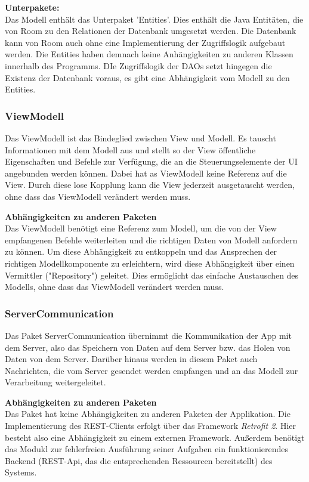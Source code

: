 \documentclass[parskip=full]{scrartcl}
\begin{document}
\textbf{Unterpakete:}\\
Das Modell enthält das Unterpaket 'Entities'. Dies enthält die Java Entitäten, die von Room zu den Relationen der Datenbank umgesetzt werden. Die Datenbank kann von Room auch ohne eine Implementierung der Zugriffslogik aufgebaut werden. Die Entities haben demnach keine Anhängigkeiten zu anderen Klassen innerhalb des Programms. DIe Zugriffslogik der DAOs setzt hingegen die Existenz der Datenbank voraus, es gibt eine Abhängigkeit vom Modell zu den Entities.

\subsubsection{ViewModell}
Das ViewModell ist das Bindeglied zwischen View und Modell. Es tauscht Informationen mit dem Modell aus und stellt so der View öffentliche Eigenschaften und Befehle zur Verfügung, die an die Steuerungselemente der UI angebunden werden können. Dabei hat as ViewModell keine Referenz auf die View. Durch diese lose Kopplung kann die View jederzeit ausgetauscht werden, ohne dass das ViewModell verändert werden muss.

\textbf{Abhängigkeiten zu anderen Paketen}\\
Das ViewModell benötigt eine Referenz zum Modell, um die von der View empfangenen Befehle weiterleiten und die richtigen Daten von Modell anfordern zu können. Um diese Abhängigkeit zu entkoppeln und das Ansprechen der richtigen Modellkomponente zu erleichtern, wird diese Abhängigkeit über einen Vermittler ("Repository") geleitet. Dies ermöglicht das einfache Austauschen des Modells, ohne dass das ViewModell verändert werden muss.

\subsubsection{ServerCommunication}
Das Paket ServerCommunication übernimmt die Kommunikation der App mit dem Server, also das Speichern von Daten auf dem Server bzw. das Holen von Daten von dem Server. Darüber hinaus werden in diesem Paket auch Nachrichten, die vom Server gesendet werden empfangen und an das Modell zur Verarbeitung weitergeleitet.

\textbf{Abhängigkeiten zu anderen Paketen}\\
Das Paket hat keine Abhängigkeiten zu anderen Paketen der Applikation. Die Implementierung des REST-Clients erfolgt über das Framework \textit{Retrofit 2}. Hier besteht also eine Abhängigkeit zu einem externen Framework. Außerdem benötigt das Modukl zur fehlerfreien Ausführung seiner Aufgaben ein funktionierendes Backend (REST-Api, das die entsprechenden Ressourcen bereitstellt) des Systems.
\end{document}
